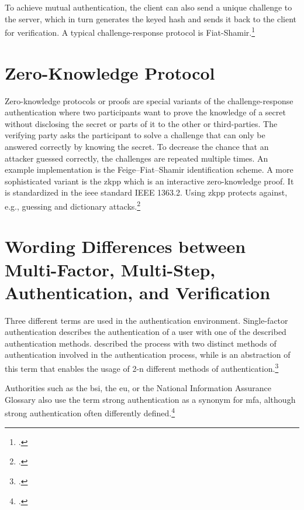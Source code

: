 To achieve mutual authentication, the client can also send a unique challenge to the server, which in turn generates the keyed hash and sends it back to the client for verification. A typical challenge-response protocol is Fiat-Shamir.\footcites[See][Chapter 13.6]{waschke2017personal}[See][489--491]{eckert-it-sec-9}

\section{Zero-Knowledge Protocol}

Zero-knowledge protocols or proofs are special variants of the challenge-response authentication where two participants want to prove the knowledge of a secret without disclosing the secret or parts of it to the other or third-parties. The verifying party asks the participant to solve a challenge that can only be answered correctly by knowing the secret. To decrease the chance that an attacker guessed correctly, the challenges are repeated multiple times. An example implementation is the Feige–Fiat–Shamir identification scheme. A more sophisticated variant is the \gls{zkpp} which is an interactive zero-knowledge proof. It is standardized in the \gls{ieee} standard IEEE 1363.2. Using \gls{zkpp} protects against, e.g., guessing and dictionary attacks.\footcites[See][492]{eckert-it-sec-9}[See][Chapter 28.3.7]{1174011}[See][769--770]{FISCHERHBNER2017759}[See][]{Feige1988}

\section{Wording Differences between Multi-Factor, Multi-Step, Authentication, and Verification}

Three different terms are used in the authentication environment. Single-factor authentication describes the authentication of a user with one of the described authentication methods.  described the process with two distinct methods of authentication involved in the authentication process, while  is an abstraction of this term that enables the usage of 2-n different methods of authentication.\footcites[See][186--188]{dasgupta2017multi}

Authorities such as the \gls{bsi}, the \gls{eu}, or the National Information Assurance Glossary also use the term \frqq strong authentication\flqq{} as a synonym for \gls{mfa}, although strong authentication often differently defined.\footcites[See][47]{CNSS4009}[See][11]{deutschland2018grundschutz}

